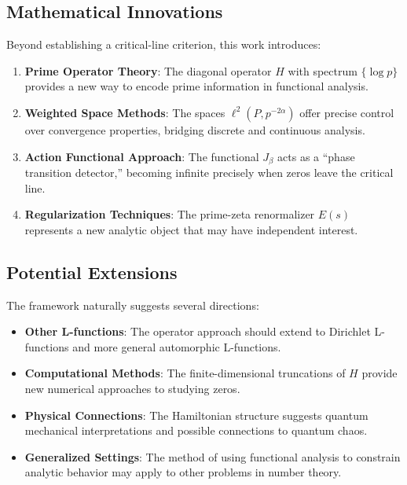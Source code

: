\documentclass[12pt]{article}
\theoremstyle{definition}
\theoremstyle{remark}
\begin{document}
\subsection{Mathematical Innovations}

Beyond establishing a critical-line criterion, this work introduces:

\begin{enumerate}
\item \textbf{Prime Operator Theory}: The diagonal operator $H$ with spectrum 
$\{\log p\}$ provides a new way to encode prime information in functional analysis.

\item \textbf{Weighted Space Methods}: The spaces $\ell^2(P, p^{-2\alpha})$ 
offer precise control over convergence properties, bridging discrete and 
continuous analysis.

\item \textbf{Action Functional Approach}: The functional $J_\beta$ acts as a 
``phase transition detector,'' becoming infinite precisely when zeros leave the 
critical line.

\item \textbf{Regularization Techniques}: The prime-zeta renormalizer $E(s)$ 
represents a new analytic object that may have independent interest.
\end{enumerate}

\subsection{Potential Extensions}

The framework naturally suggests several directions:

\begin{itemize}
\item \textbf{Other L-functions}: The operator approach should extend to 
Dirichlet L-functions and more general automorphic L-functions.

\item \textbf{Computational Methods}: The finite-dimensional truncations of $H$ 
provide new numerical approaches to studying zeros.

\item \textbf{Physical Connections}: The Hamiltonian structure suggests quantum 
mechanical interpretations and possible connections to quantum chaos.

\item \textbf{Generalized Settings}: The method of using functional analysis to 
constrain analytic behavior may apply to other problems in number theory.
\end{itemize}
\end{document}
